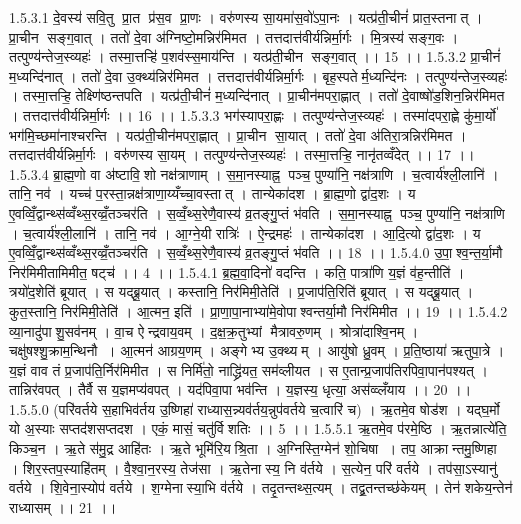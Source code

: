 1.5.3.1
दे॒वस्य॑ सवि॒तु प्रा॒त प्र॑स॒व प्रा॒णः । वरु॑णस्य सा॒यमा॑स॒वो॑ऽपा॒नः । यत्प्र॑ती॒चीनं॑ प्रात॒स्तनात् । प्रा॒चीन॑ सङ्ग॒वात् । ततो॑ दे॒वा अ॑ग्निष्टो॒मन्निर॑मिमत । तत्तदात्त॑वीर्यन्निर्मा॒र्गः । मि॒त्रस्य॑ सङ्ग॒वः । तत्पुण्य॑न्तेज॒स्व्यहः॑ । तस्मा॒त्तऱ्हि॑ प॒शव॑स्स॒माय॑न्ति । यत्प्र॑ती॒चीन॑ सङ्ग॒वात् ।। 15 ।।
1.5.3.2
प्रा॒चीनं॑ म॒ध्यन्दि॑नात् । ततो॑ दे॒वा उ॒क्थ्य॑न्निर॑मिमत । तत्तदात्त॑वीर्यन्निर्मा॒र्गः । बृह॒स्पतेर्म॒ध्यन्दि॑नः । तत्पुण्य॑न्तेज॒स्व्यहः॑ । तस्मा॒त्तऱ्हि॒ तेक्ष्णि॑ष्ठन्तपति । यत्प्र॑ती॒चीनं॑ म॒ध्यन्दि॑नात् । प्रा॒चीन॑मपरा॒ह्णात् । ततो॑ दे॒वाष्षो॑ड॒शिन॒न्निर॑मिमत । तत्तदात्त॑वीर्यन्निर्मा॒र्गः ।। 16 ।।
1.5.3.3
भग॑स्यापरा॒ह्णः । तत्पुण्य॑न्तेज॒स्व्यहः॑ । तस्मा॑दपरा॒ह्णे कु॑मा॒र्यो॑ भग॑मि॒च्छमा॑नाश्चरन्ति । यत्प्र॑ती॒चीन॑मपरा॒ह्णात् । प्रा॒चीन॑ सा॒यात् । ततो॑ दे॒वा अ॑तिरा॒त्रन्निर॑मिमत । तत्तदात्त॑वीर्यन्निर्मा॒र्गः । वरु॑णस्य सा॒यम् । तत्पुण्य॑न्तेज॒स्व्यहः॑ । तस्मा॒त्तऱ्हि॒ नानृ॑तव्वँदेत् ।। 17 ।।
1.5.3.4
ब्रा॒ह्म॒णो वा अ॑ष्टावि॒॒शो नक्ष॑त्राणाम् । स॒मा॒नस्याह्न॒ पञ्च॒ पुण्या॑नि॒ नक्ष॑त्राणि । च॒त्वार्य॑श्ली॒लानि॑ । तानि॒ नव॑ । यच्च॑ प॒रस्ता॒न्नक्ष॑त्राणा॒य्यँच्चा॒वस्तात् । तान्येका॑दश । ब्रा॒ह्म॒णो द्वा॑द॒शः । य ए॒वव्विँ॒द्वान्थ्स॑व्वँथ्स॒रव्व्रँ॒तञ्चर॑ति । स॒व्वँ॒थ्स॒रेणै॒वास्य॑ व्र॒तङ्गु॒प्तं भ॑वति । स॒मा॒नस्याह्न॒ पञ्च॒ पुण्या॑नि॒ नक्ष॑त्राणि । च॒त्वार्य॑श्ली॒लानि॑ । तानि॒ नव॑ । आ॒ग्ने॒यी रात्रिः॑ । ऐ॒न्द्रमहः॑ । तान्येका॑दश । आ॒दि॒त्यो द्वा॑द॒शः । य ए॒वव्विँ॒द्वान्थ्स॑व्वँथ्स॒रव्व्रँ॒तञ्चर॑ति । स॒व्वँ॒थ्स॒रेणै॒वास्य॑ व्र॒तङ्गु॒प्तं भ॑वति ।। 18 ।।
1.5.4.0
उ॒पा॒॒श्व॒न्त॒र्या॒मौ निर॑मिमीतामिमीत॒ षट्च॑ ।। 4 ।।
1.5.4.1
ब्र॒ह्म॒वा॒दिनो॑ वदन्ति । कति॒ पात्रा॑णि य॒ज्ञं व॑ह॒न्तीति॑ । त्रयो॑द॒शेति॑ ब्रूयात् । स यद्ब्रू॒यात् । कस्तानि॒ निर॑मिमी॒तेति॑ । प्र॒जाप॑ति॒रिति॑ ब्रूयात् । स यद्ब्रू॒यात् । कुत॒स्तानि॒ निर॑मिमी॒तेति॑ । आ॒त्मन॒ इति॑ । प्रा॒णा॒पा॒नाभ्या॑मे॒वोपा॑श्वन्तर्या॒मौ निर॑मिमीत ।। 19 ।।
1.5.4.2
व्या॒नादु॑पाशु॒सव॑नम् । वा॒च ऐन्द्रवाय॒वम् । द॒क्ष॒क्र॒तुभ्यां मैत्रावरु॒णम् । श्रोत्रा॑दाश्वि॒नम् । चक्षु॑षश्शु॒क्राम॒न्थिनौ । आ॒त्मन॑ आग्रय॒णम् । अङ्गेभ्य उ॒क्थ्यम् । आयु॑षो ध्रु॒वम् । प्र॒ति॒ष्ठाया॑ ऋतुपा॒त्रे । य॒ज्ञं वाव तं प्र॒जाप॑ति॒र्निर॑मिमीत । स निर्मि॑तो॒ नाद्ध्रि॑यत॒ सम॑व्लीयत । स ए॒तान्प्र॒जाप॑तिरपिवा॒पान॑पश्यत् । तान्निर॑वपत् । तैर्वै स य॒ज्ञमप्य॑वपत् । यद॑पिवा॒पा भव॑न्ति । य॒ज्ञस्य॒ धृत्या॒ अस॑व्व्लँयाय ।। 20 ।।
1.5.5.0
(परि॑वर्तये स॒हाभिव॑र्तय उ॒ष्णिहा॑ राध्यास॒न्न्यव॑र्तय॒न्नुप॑वर्तये च॒त्वारि॑ च) । ऋ॒तमे॒व षोड॑श । यद्घ॒र्मो यो अ॒स्याः सप्तद॑शसप्तदश । एकं॒ मासं॒ चतु॑र्विशतिः ।। 5 ।।
1.5.5.1
ऋ॒तमे॒व प॑रमे॒ष्ठि । ऋ॒तन्नात्ये॑ति॒ किञ्च॒न । ऋ॒ते स॑मु॒द्र आहि॑तः । ऋ॒ते भूमि॑रि॒यश्रि॒ता । अ॒ग्निस्ति॒ग्मेन॑ शो॒चिषा । तप॒ आक्रान्तमु॒ष्णिहा । शिर॒स्तप॒स्याहि॑तम् । वै॒श्वा॒न॒रस्य॒ तेज॑सा । ऋ॒तेनास्य॒ नि व॑र्तये । स॒त्येन॒ परि॑ वर्तये । तप॑सा॒ऽस्यानु॑ वर्तये । शि॒वेना॒स्योप॑ वर्तये । श॒ग्मेनास्या॒भि व॑र्तये । तदृ॒तन्तथ्स॒त्यम् । तद्व्र॒तन्तच्छ॑केयम् । तेन॑ शकेय॒न्तेन॑ राध्यासम् ।। 21 ।।
